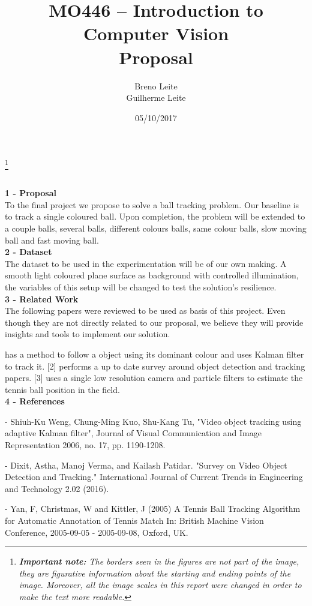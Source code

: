\documentclass[12pt,a4paper]{article}
\title{MO446 -- Introduction to Computer Vision  \\ Proposal}
\author{Breno Leite  \\ Guilherme Leite}
\date{05/10/2017}
\newcommand\blfootnote[1]{%
	\begingroup
	\renewcommand\thefootnote{}\footnote{#1}%
	\addtocounter{footnote}{-1}%
	\endgroup
}
\begin{document}
\maketitle
\blfootnote{\textit{\textbf{Important note:} The borders seen in the figures are not part of the image, they are figurative information about the starting and ending points of the image. Moreover, all the image scales in this report were changed in order to make the text more readable.}} \\


\textbf{\LARGE 1 - Proposal} \\

	To the final project we propose to solve a ball tracking problem. Our baseline is to track a single coloured ball. Upon completion, the problem will be extended to a couple balls, several balls, different colours balls, same colour balls, slow moving ball and fast moving ball.\\
	
\textbf{\LARGE 2 - Dataset} \\

	The dataset to be used in the experimentation will be of our own making. A smooth light coloured plane surface as background with controlled illumination, the variables of this setup will be changed to test the solution's resilience.\\

\textbf{\LARGE 3 - Related Work} \\

	The following papers were reviewed to be used as basis of this project. Even though they are not directly related to our proposal, we believe they will provide insights and tools to implement our solution.
	\par[1] has a method to follow a object using its dominant colour and uses Kalman filter to track it. [2] performs a up to date survey around object detection and tracking papers. [3] uses a single low resolution camera and particle filters to estimate the tennis ball position in the field.\\
	
\textbf{\LARGE 4 - References} \\

	\par [1] - Shiuh-Ku Weng, Chung-Ming Kuo, Shu-Kang Tu, "Video object tracking using adaptive Kalman filter", Journal of Visual Communication and Image Representation 2006, no. 17, pp. 1190-1208.
	\par [2] - Dixit, Astha, Manoj Verma, and Kailash Patidar. "Survey on Video Object Detection and Tracking." International Journal of Current Trends in Engineering and Technology 2.02 (2016).
	\par [3] - Yan, F, Christmas, W and Kittler, J (2005) A Tennis Ball Tracking Algorithm for Automatic Annotation of Tennis Match In: British Machine Vision Conference, 2005-09-05 - 2005-09-08, Oxford, UK.
\end{document}
